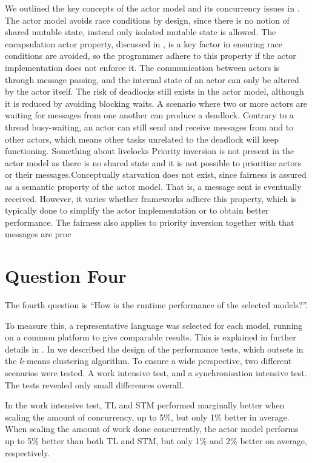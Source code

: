 We outlined the key concepts of the actor model and its concurrency issues in . The actor model avoids race conditions by design, since there is no notion of shared mutable state, instead only isolated mutable state is allowed. The encapsulation actor property, discussed in , is a key factor in ensuring race conditions are avoided, so the programmer adhere to this property if the actor implementation does not enforce it. The communication between actors is through message passing, and the internal state of an actor can only be altered by the actor itself. The risk of deadlocks still exists in the actor model, although it is reduced by avoiding blocking waits. A scenario where two or more actors are waiting for messages from one another can produce a deadlock. Contrary to a thread busy-waiting, an actor can still send and receive messages from and to other actors, which means other tasks unrelated to the deadlock will keep functioning. 
Something about livelocks%
Priority inversion is not present in the actor model as there is no shared state and it is not possible to prioritize actors or their messages.Conceptually starvation does not exist, since fairness is assured as a semantic property of the actor model. That is, a message sent is eventually received. However, it varies whether frameworks adhere this property, which is typically done to simplify the actor implementation or to obtain better performance. The fairness also applies to priority inversion together with that messages are proc
\section{Question Four}
The fourth question is ``How is the runtime performance of the selected models?''.

To measure this, a representative language was selected for each model, running on a common platform to give comparable results. This is explained in further details in . In  we described the design of the performance tests, which outsets in the $k$-means clustering algorithm. To ensure a wide perspective, two different scenarios were tested. A work intensive test, and a synchronisation intensive test. The tests revealed only small differences overall. 

In the work intensive test, \ac{TL} and \ac{STM} performed marginally better when scaling the amount of concurrency, up to 5\%, but only 1\% better in average. When scaling the amount of work done concurrently, the actor model performs up to 5\% better than both \ac{TL} and \ac{STM}, but only 1\% and 2\% better on average, respectively.

